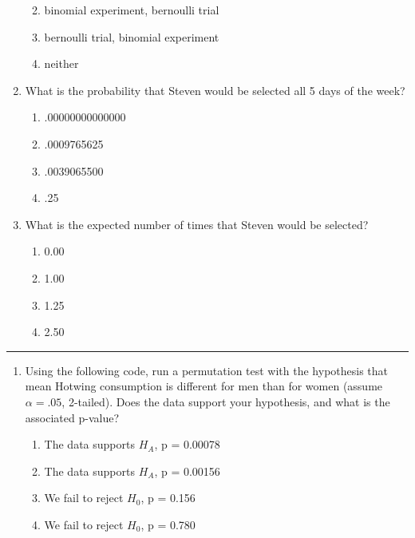 \documentclass[]{article}
\begin{document}
\begin{enumerate}
  \begin{enumerate}
  \def\labelenumii{\alph{enumii}.}
  \item
    binomial experiment, bernoulli trial
  \item
    bernoulli trial, binomial experiment
  \item
    neither
  \end{enumerate}
\item
  What is the probability that Steven would be selected all 5 days of
  the week?

  \begin{enumerate}
  \def\labelenumii{\alph{enumii}.}
  \item
    .00000000000000
  \item
    .0009765625
  \item
    .0039065500
  \item
    .25
  \end{enumerate}
\item
  What is the expected number of times that Steven would be selected?

  \begin{enumerate}
  \def\labelenumii{\alph{enumii}.}
  \item
    0.00
  \item
    1.00
  \item
    1.25
  \item
    2.50
  \end{enumerate}
\end{enumerate}

\begin{center}\rule{0.5\linewidth}{\linethickness}\end{center}

\begin{enumerate}
\def\labelenumi{\arabic{enumi}.}
\setcounter{enumi}{29}
\item
  Using the following code, run a permutation test with the hypothesis
  that mean Hotwing consumption is different for men than for women
  (assume \(\alpha = .05\), 2-tailed). Does the data support your
  hypothesis, and what is the associated p-value?

  \begin{enumerate}
  \def\labelenumii{\alph{enumii}.}
  \item
    The data supports \(H_A\), p = 0.00078
  \item
    The data supports \(H_A\), p = 0.00156
  \item
    We fail to reject \(H_0\), p = 0.156
  \item
    We fail to reject \(H_0\), p = 0.780
  \end{enumerate}
\end{enumerate}
\end{document}
